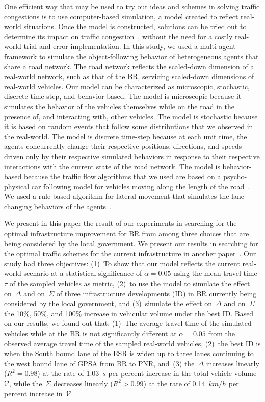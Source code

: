 \documentclass[preprint]{./acm_proc_article-sp}
\begin{document}
One efficient way that may be used to try out ideas and schemes in solving traffic congestions is to use computer-based simulation, a model created to reflect real-world situations. Once the model is constructed, solutions can be tried out to determine its impact on traffic congestion~\citep{bared02}, without the need for a costly real-world trial-and-error implementation. In this study, we used a multi-agent framework to simulate the object-following behavior of heterogeneous agents that share a road network. The road network reflects the scaled-down dimension of a real-world network, such as that of the BR, servicing scaled-down dimensions of real-world vehicles. Our model can be characterized as microscopic, stochastic, discrete time-step, and behavior-based. The model is microscopic because it simulates the behavior of the vehicles themselves while on the road in the presence of, and interacting with, other vehicles. The model is stochastic because it is based on random events that follow some distributions that we observed in the real-world. The model is discrete time-step because at each unit time, the agents concurrently change their respective positions, directions, and speeds driven only by their respective simulated behaviors in response to their respective interactions with the current state of the road network. The model is behavior-based because the traffic flow algorithms that we used are based on a psycho-physical car following model for vehicles moving along the length of the road~\citep{fritzsche94,gipps81}. We used a rule-based algorithm for lateral movement that simulates the lane-changing behaviors of the agents~\citep{alshihabi03,VISSIM90}. 

We present in this paper the result of our experiments in searching for the optimal infrastructure improvement for BR from among three choices that are being considered by the local government. We  present our results in searching for the optimal traffic schemes for the current infrastructure in another paper~\citep{tataro13}. Our study had three objectives: (1)~To show that our model reflects the current real-world scenario at a statistical significance of $\alpha=0.05$ using the mean travel time~$\tau$ of the sampled vehicles as metric, (2)~to use the model to simulate the effect on~$\Delta$ and on~$\Sigma$ of three infrastructure developments (ID) in BR currently being considered by the local government, and (3)~simulate the effect on~$\Delta$ and on~$\Sigma$ the 10\%, 50\%, and 100\% increase in vehicular volume under the best ID. Based on our results, we found out that: (1)~The average travel time of the simulated vehicles while at the BR is not significantly different at $\alpha=0.05$ from the observed average travel time of the sampled real-world vehicles, (2)~the best ID is when the South bound lane of the ESR is widen up to three lanes continuing to the west bound lane of GPSA from BR to PNR, and~(3) the~$\Delta$ increases linearly ($R^2=0.98$) at the rate of 1.03~$s$ per percent increase in the total vehicle volume~$\mathcal{V}$, while the~$\Sigma$ decreases linearly ($R^2>0.99$) at the rate of 0.14~$km/h$ per percent increase in~$\mathcal{V}$.
\end{document}
